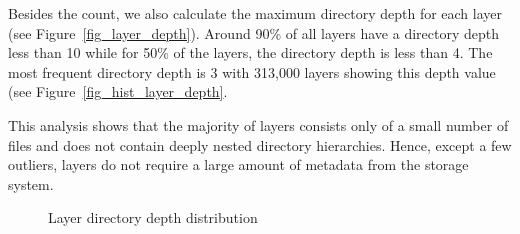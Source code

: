 
Besides the count, we also calculate the maximum directory depth for each layer
(see Figure~\ref{fig_layer_depth}).
%
Around 90\% of all layers have a directory depth less than 10
while for 50\% of the layers, the directory depth is less than 4. 
%
The most frequent directory depth is 3 with 313,000 layers showing
this depth value (see Figure~\ref{fig_hist_layer_depth}.
%
%

This analysis shows that the majority of layers consists only of a small number
of files and does not contain deeply nested directory hierarchies. Hence, except
a few outliers, layers do not require a large amount of metadata from the storage
system.

\begin{figure}[!t]
	\centering
	\caption{Layer directory depth distribution}
	\label{fig-layer-dir}
\end{figure}
